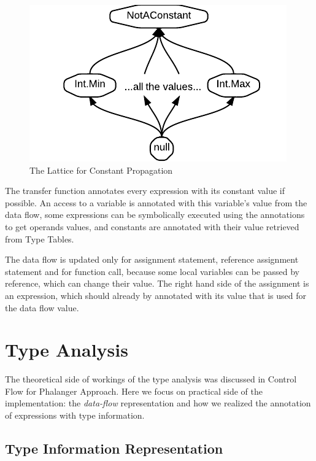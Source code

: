 \begin{figure}[h]  
  \centering
    \includegraphics{img/ConstLattice.pdf}  
    \caption{The Lattice for Constant Propagation\label{constlattice}}
\end{figure}        
        
        The transfer function annotates every expression 
        with its constant value if possible. An access to a 
        variable is annotated with this variable's value 
        from the data flow, some expressions can be symbolically 
        executed using the annotations to get operands values, 
        and constants are annotated with their value retrieved 
        from Type Tables.
        
        The data flow is updated only for assignment statement, 
        reference assignment statement and for function call, 
        because some local variables can be passed by reference, 
        which can change their value. The right hand side of 
        the assignment is an expression, which should already by 
        annotated with its value that is used for the data 
        flow value.
        

        

    \section{Type Analysis}
        
        The theoretical side of workings of the type analysis was 
        discussed in \wsection{} Control Flow for Phalanger Approach. 
        Here we focus on practical side of the implementation: the 
        \emph{data-flow} representation and how we realized the 
        annotation of expressions with type information.
        
        \subsection{Type Information Representation}
        
